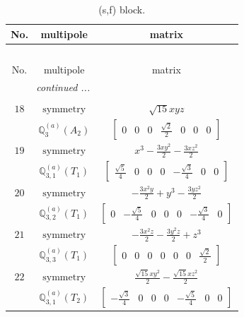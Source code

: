\documentclass[fleqn,8pt,landscape]{jsarticle}
\begin{document}
\begin{longtable}{ccc}
\caption{(s,f) block.}
 \\
 \hline \hline
No. & multipole & matrix \\ \hline \endfirsthead

\multicolumn{2}{l}{\tablename\ \thetable{}} \\
 \hline \hline
No. & multipole & matrix \\ \hline \endhead

 \hline \hline
\multicolumn{2}{r}{\footnotesize\it continued ...} \\ \endfoot

 \hline \hline
\multicolumn{2}{r}{} \\ \endlastfoot

$ 18 $ & $ \text{symmetry} $ & $ \sqrt{15} x y z $ \\
$  $ & $ \mathbb{Q}_{3}^{(a)}(A_{2}) $ & $ \begin{bmatrix} 0 & 0 & 0 & \frac{\sqrt{2}}{2} & 0 & 0 & 0 \end{bmatrix} $ \\ \hline
$ 19 $ & $ \text{symmetry} $ & $ x^{3} - \frac{3 x y^{2}}{2} - \frac{3 x z^{2}}{2} $ \\
$  $ & $ \mathbb{Q}_{3,1}^{(a)}(T_{1}) $ & $ \begin{bmatrix} \frac{\sqrt{5}}{4} & 0 & 0 & 0 & - \frac{\sqrt{3}}{4} & 0 & 0 \end{bmatrix} $ \\ \hline
$ 20 $ & $ \text{symmetry} $ & $ - \frac{3 x^{2} y}{2} + y^{3} - \frac{3 y z^{2}}{2} $ \\
$  $ & $ \mathbb{Q}_{3,2}^{(a)}(T_{1}) $ & $ \begin{bmatrix} 0 & - \frac{\sqrt{5}}{4} & 0 & 0 & 0 & - \frac{\sqrt{3}}{4} & 0 \end{bmatrix} $ \\ \hline
$ 21 $ & $ \text{symmetry} $ & $ - \frac{3 x^{2} z}{2} - \frac{3 y^{2} z}{2} + z^{3} $ \\
$  $ & $ \mathbb{Q}_{3,3}^{(a)}(T_{1}) $ & $ \begin{bmatrix} 0 & 0 & 0 & 0 & 0 & 0 & \frac{\sqrt{2}}{2} \end{bmatrix} $ \\ \hline
$ 22 $ & $ \text{symmetry} $ & $ \frac{\sqrt{15} x y^{2}}{2} - \frac{\sqrt{15} x z^{2}}{2} $ \\
$  $ & $ \mathbb{Q}_{3,1}^{(a)}(T_{2}) $ & $ \begin{bmatrix} - \frac{\sqrt{3}}{4} & 0 & 0 & 0 & - \frac{\sqrt{5}}{4} & 0 & 0 \end{bmatrix} $ \\ \hline

\end{longtable}
\end{document}
